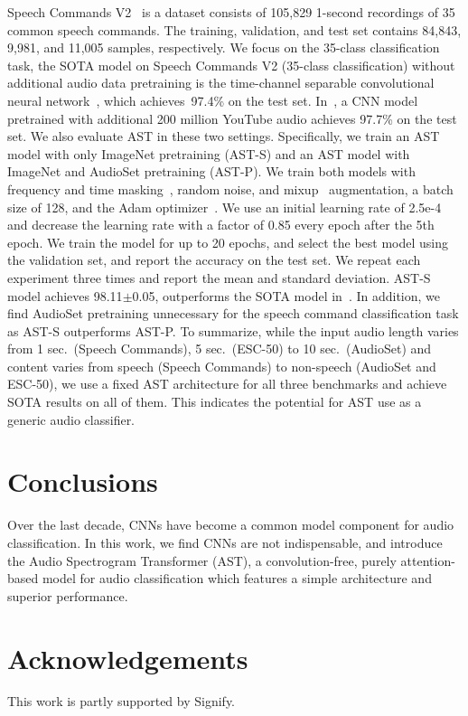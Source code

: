 \documentclass[a4paper]{article}
\begin{document}
Speech Commands V2~\cite{warden2018speech} is a dataset consists of 105,829 1-second recordings of 35 common speech commands. The training, validation, and test set contains 84,843, 9,981, and 11,005 samples, respectively. We focus on the 35-class classification task, the SOTA model on Speech Commands V2 (35-class classification) without additional audio data pretraining is the time-channel separable convolutional neural network~\cite{majumdar2020matchboxnet}, which achieves~97.4\% on the test set. In~\cite{lin2020training}, a CNN model pretrained with additional 200 million YouTube audio achieves 97.7\% on the test set. We also evaluate AST in these two settings. Specifically, we train an AST model with only ImageNet pretraining (AST-S) and an AST model with ImageNet and AudioSet pretraining (AST-P). We train both models with frequency and time masking~\cite{park2019specaugment}, random noise, and mixup~\cite{tokozume2018learning} augmentation, a batch size of 128, and the Adam optimizer~\cite{kingma2015adam}. We use an initial learning rate of 2.5e-4 and decrease the learning rate with a factor of 0.85 every epoch after the 5th epoch. We train the model for up to 20 epochs, and select the best model using the validation set, and report the accuracy on the test set. We repeat each experiment three times and report the mean and standard deviation. AST-S model achieves 98.11$\pm$0.05, outperforms the SOTA model in~\cite{rybakov2020streaming}. In addition, we find AudioSet pretraining unnecessary for the speech command classification task as AST-S outperforms AST-P. 
To summarize, while the input audio length varies from 1 sec.~(Speech Commands), 5 sec.~(ESC-50) to 10 sec.~(AudioSet) and content varies from speech (Speech Commands) to non-speech (AudioSet and ESC-50), we use a fixed AST architecture for all three benchmarks and achieve SOTA results on all of them. This indicates the  potential for AST use as a generic audio classifier.


\section{Conclusions}

Over the last decade, CNNs have become a common model component for audio classification. In this work, we find CNNs are not indispensable, and introduce the Audio Spectrogram Transformer (AST), a convolution-free, purely attention-based model for audio classification which features a simple architecture and superior performance.



\section{Acknowledgements} This work is partly supported by Signify.

\newpage




\end{document}
